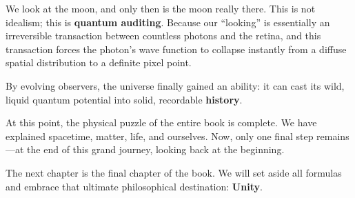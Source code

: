 We look at the moon, and only then is the moon really there. This is not idealism; this is \textbf{quantum auditing}. Because our ``looking'' is essentially an irreversible transaction between countless photons and the retina, and this transaction forces the photon's wave function to collapse instantly from a diffuse spatial distribution to a definite pixel point.

By evolving observers, the universe finally gained an ability: it can cast its wild, liquid quantum potential into solid, recordable \textbf{history}.

At this point, the physical puzzle of the entire book is complete. We have explained spacetime, matter, life, and ourselves. Now, only one final step remains---at the end of this grand journey, looking back at the beginning.

The next chapter is the final chapter of the book. We will set aside all formulas and embrace that ultimate philosophical destination: \textbf{Unity}.

